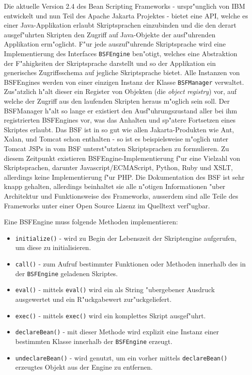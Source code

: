 Die aktuelle Version 2.4 des Bean Scripting Frameworks - urspr"unglich von IBM entwickelt und nun Teil des
Apache Jakarta Projektes \cite{BSFHP} - bietet eine API, welche es einer Java-Applikation erlaubt 
Skriptsprachen einzubinden und die den derart ausgef"uhrten Skripten den Zugriff auf Java-Objekte der ausf"uhrenden Applikation erm"oglicht.
F"ur jede auszuf"uhrende Skriptsprache wird eine Implementierung des Interfaces \texttt{BSFEngine} ben"otigt, welches eine
Abstraktion der F"ahigkeiten der Skriptsprache darstellt und so der Applikation ein generisches Zugriffsschema
auf jegliche Skriptsprache bietet. Alle Instanzen von BSFEngines werden von einer einzigen Instanz der Klasse \texttt{BSFManager} 
verwaltet. Zus"atzlich h"alt dieser ein Register von Objekten (die \emph{object registry}) vor, auf welche der Zugriff aus den 
laufenden Skripten heraus m"oglich sein soll. Der BSFManager h"alt so lange er existiert den Ausf"uhrungszustand aller bei 
ihm registrierten BSFEngines vor, was das Anhalten und sp"atere Fortsetzen eines Skriptes erlaubt.
Das BSF ist in so gut wie allen Jakarta-Produkten wie Ant, Xalan, und Tomcat schon enthalten - so ist es beispielsweise
m"oglich unter Tomcat JSPs in vom BSF unterst"utzten Skriptsprachen zu formulieren.
Zu diesem Zeitpunkt existieren BSFEngine-Implementierung f"ur eine Vielzahl von Skriptsprachen, darunter Javascript/ECMAScript, 
Python, Ruby und XSLT, allerdings keine Implementierung f"ur PHP. Die Dokumentation des BSF ist sehr knapp gehalten, allerdings
beinhaltet sie alle n"otigen Informationen "uber Architektur und Funktionsweise des Frameworks, ausserdem sind alle
Teile des Frameworks unter einer Open Source Lizenz im Quelltext verf"ugbar.

Eine BSFEngine muss folgende Methoden implementieren:
\begin{itemize}
    \item \texttt{initialize()} - wird zu Begin der Lebenszeit der Skriptengine aufgerufen, um diese zu initialisieren.
    \item \texttt{call()} - zum Aufruf bestimmter Funktionen oder Methoden innerhalb des in der \texttt{BSFEngine} geladenen Skriptes.
    \item \texttt{eval()} - mittels \texttt{eval()} wird ein als String "ubergebener Ausdruck ausgewertet und ein R"uckgabewert zur"uckgeliefert.
    \item \texttt{exec()} - mittels \texttt{exec()} wird ein komplettes Skript ausgef"uhrt.
    \item \texttt{declareBean()} - mit dieser Methode wird explizit eine Instanz einer bestimmten Klasse innerhalb der \texttt{BSFEngine} erzeugt.
    \item \texttt{undeclareBean()} - wird genutzt, um ein vorher mittels \texttt{declareBean()} erzeugtes Objekt aus der Engine zu entfernen.
\end{itemize}

